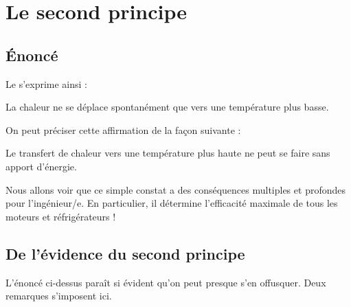 \section{Le second principe}

	\subsection{Énoncé}
	\label{ch_second_principe_enonce}

		Le  s’exprime ainsi :

		\begin{principe}
			La chaleur ne se déplace spontanément que vers une température plus basse.
		\end{principe}

		On peut préciser cette affirmation de la façon suivante :

		\begin{trucimportant}
			Le transfert de chaleur vers une température plus haute\linebreak
			ne peut se faire sans apport d’énergie.
		\end{trucimportant}

		Nous allons voir que ce simple constat a des conséquences multiples et profondes pour l’ingénieur/e. En particulier, il détermine l’efficacité maximale de tous les moteurs et réfrigérateurs !



	\subsection{De l’évidence du second principe}

		L’énoncé ci-dessus paraît si évident qu’on peut presque s’en offusquer. Deux remarques s’imposent ici.

